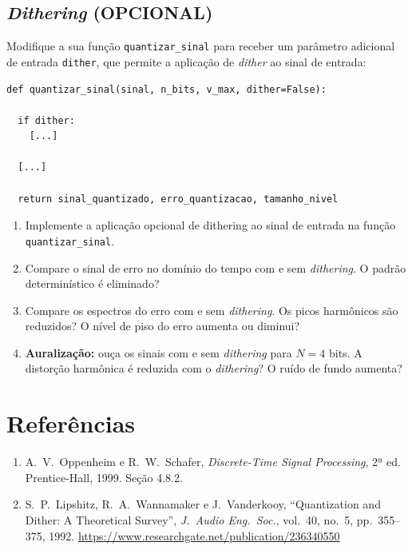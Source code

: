 \documentclass[a4paper,twoside,12pt]{article}
\begin{document}
	
	\subsection{\textit{Dithering} (OPCIONAL)}
	\label{sec:ex3}
	
	Modifique a sua função {\tt quantizar\_sinal} para receber um parâmetro adicional de entrada {\tt dither}, que permite a aplicação de \emph{dither} ao sinal de entrada:
	
\begin{lstlisting}[frame=single]
def quantizar_sinal(sinal, n_bits, v_max, dither=False):

  if dither:
    [...]
	
  [...]
		
  return sinal_quantizado, erro_quantizacao, tamanho_nivel
\end{lstlisting} 
	
	
	\begin{enumerate}
		\item Implemente a aplicação opcional de dithering ao sinal de entrada na função {\tt quantizar\_sinal}.
		
		\item Compare o sinal de erro no domínio do tempo com e sem \textit{dithering}. O padrão determinístico é eliminado?
		
		\item Compare os espectros do erro com e sem \textit{dithering}. Os picos harmônicos são reduzidos? O nível de piso do erro aumenta ou diminui?
		
		\item \textbf{Auralização:} ouça os sinais com e sem \textit{dithering} para $N = 4$ bits. A distorção harmônica é reduzida com o \textit{dithering}? O ruído de fundo aumenta?
	\end{enumerate}
	
	
	\section{Referências}
	
	\begin{enumerate}
		\item A.~V.~Oppenheim e R.~W.~Schafer, \textit{Discrete-Time Signal
			Processing}, 2ª ed. Prentice-Hall, 1999. Seção 4.8.2.
		
		\item S.~P.~Lipshitz, R.~A.~Wannamaker e J.~Vanderkooy,
		``Quantization and Dither: A Theoretical Survey'', \textit{J.\
			Audio Eng.\ Soc.}, vol.~40, no.~5, pp.~355--375, 1992.
		\url{https://www.researchgate.net/publication/236340550}
	\end{enumerate}
\end{document}
